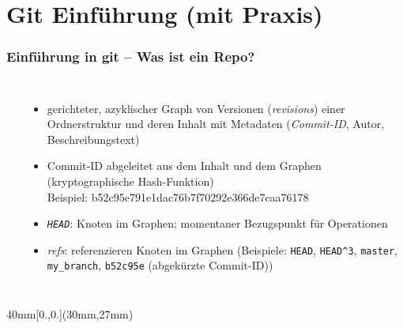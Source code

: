 \documentclass{beamer}
\begin{document}
\section{Git Einführung (mit Praxis)}
\begin{frame}[label=ef1]
\frametitle{Einführung in git – Was ist ein Repo?}
\begin{columns}
  ~
  \begin{itemize}
  \item gerichteter, azyklischer Graph von Versionen
    (\emph{revisions}) einer Ordnerstruktur und deren Inhalt mit
    Metadaten (\emph{Commit-ID}, Autor, Beschreibungstext)
  \item Commit-ID abgeleitet aus dem Inhalt und dem Graphen
    (kryptographische Hash-Funktion)\\
    \pause
    {\tiny Beispiel: b52c95e791e1dac76b7f70292e366de7caa76178}
  \item \emph{\texttt{HEAD}}: Knoten im Graphen; momentaner
    Bezugspunkt für Operationen
  \item \emph{refs}: referenzieren Knoten im Graphen (Beispiele:
    \texttt{HEAD}, \texttt{HEAD\^{}3}, \texttt{master}, \texttt{my\_branch}, \texttt{b52c95e} {\tiny (abgekürzte
    Commit-ID)})
  \end{itemize}
\end{columns}

\begin{textblock*}{40mm}[0.,0.](30mm,27mm)
{
}
\end{textblock*}

\end{frame}
\end{document}
